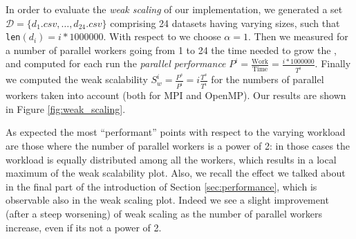 \documentclass{article}
\begin{document}
In order to evaluate the \emph{weak scaling} of our implementation, we generated
a set $\mathcal{D} = \{d_1.csv, \dots, d_{24}.csv\}$ comprising 24 datasets
having varying sizes, such that \texttt{len}$(d_i) = i * 1000000$. With respect
to \cite[Chapter~5.3.2]{hager2010introduction} we choose $\alpha = 1$. Then we
measured for a number of parallel workers going from 1 to 24 the time needed to
grow the \kdtree{}, and computed for each run the \emph{parallel performance}
$P^i = \frac{\text{Work}}{\text{Time}} = \frac{i * 1000000}{T^i}$. Finally we
computed the weak scalability $S_w^i = \frac{P^s}{P^i} = i \frac{T^s}{T^i}$ for
the numbers of parallel workers taken into account (both for MPI and OpenMP).
Our results are shown in Figure \ref{fig:weak_scaling}.

As expected the most ``performant'' points with respect to the varying workload
are those where the number of parallel workers is a power of 2: in those cases
the workload is equally distributed among all the workers, which results in a
local maximum of the weak scalability plot. Also, we recall the effect we
talked about in the final part of the introduction of Section
\ref{sec:performance}, which is observable also in the weak scaling plot. Indeed
we see a slight improvement (after a steep worsening) of weak scaling as the
number of parallel workers increase, even if its not a power of 2.
\end{document}
